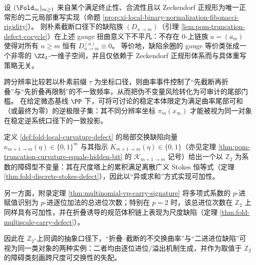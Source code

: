 \begin{conjecture}\label{conj:pom-zeckendorf-defect-class-nontrivial}
设 \((\Fold_m)_{m\ge 1}\) 来自某个满足终止性、合流性且以 Zeckendorf 正规形为唯一正常形的二元局部重写实现（命题 \ref{prop:xi-local-binary-normalization-fibonacci-rigidity}）。
则朴素截断口径下的缺陷族 \((D_{n\to m})\)（引理 \ref{lem:pom-truncation-defect-cocycle}）在上述 gauge 扭曲意义下不平凡：不存在 \(0\)-上链族 \(a=(a_m)\) 使得对所有 \(n\ge m\) 恒有 \(D^{(a)}_{n\to m}\equiv 0\)。
等价地，缺陷余圈的 gauge 等价类张成一个非零的 \(\ZZ_2\)-一维子空间，并且仅依赖于 Zeckendorf 正规形体系而与具体重写策略无关。
\end{conjecture}

\begin{remark}[曲率尾部门槛与逆极限粒子化判据]\label{rem:pom-curvature-particleization}
跨分辨率比较若以朴素前缀 $\tau$ 为坐标口径，则曲率事件控制了“先截断再折叠”与“先折叠再限制”的不一致频率，从而把伪不变量风险转化为可审计的尾部门槛。
在给定微态基线 $\PP$ 下，可将可讨论的稳定本体限定为满足曲率尾部可和（或最终为零）的逆极限子集：其不同分辨率坐标 $\pi_m(x_\infty)$ 才能被视为同一对象在稳定逆系统口径下的一致投影。
\end{remark}

\begin{proposition}\label{prop:pom-curvature-carry-defect-z2-obstruction-principle}
定义 \ref{def:fold-local-curvature-defect} 的局部交换缺陷向量 \(\kappa_{m+1\to m}(\eta)\in\{0,1\}^m\) 与其指示 \(K_{m+1\to m}(\eta)\in\{0,1\}\)（亦见定理 \ref{thm:pom-truncation-curvature-equals-hidden-bit} 的 \(\mathcal K_{m+1\to m}\) 记号）给出一个以 \(\mathbb Z_2\) 为系数的障碍型不变量：其在尺度塔上的累积满足离散广义 Stokes 恒等式（定理 \ref{thm:fold-discrete-stokes-defect}），因此以“异或求和”方式实现可加性。
\par
另一方面，附录定理 \ref{thm:multinomial-vp-carry-signature} 将多项式系数的 \(p\)-进赋值识别为 \(p\)-进逐位加法的总进位次数；特别在 \(p=2\) 时，该总进位次数在 \(\mathbb Z_2\) 上同样具有可加性，并在折叠诱导的规范体积链上表现为尺度缺陷（定理 \ref{thm:fold-multiscale-carry-defect}）。
\par
因此在 \(\mathbb Z_2\)-上同调的抽象口径下，“折叠--截断的不交换曲率”与“二进进位缺陷”可视为同一类对象的两种实例：二者均由逐位进位/溢出机制生成，并作为取值于 \(\mathbb Z_2\) 的障碍类刻画跨尺度可交换性的失配。
\end{proposition}

